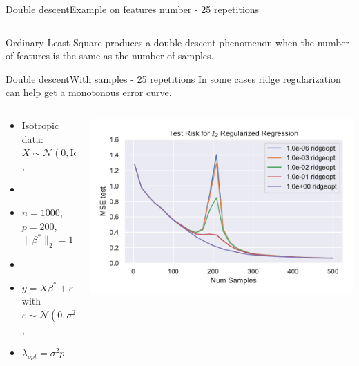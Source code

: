 \documentclass[10pt,aspectratio=43]{beamer}
\begin{document}
\begin{frame}{Double descent}{Example on features number - 25 repetitions}
\begin{columns}
\begin{column}{0.7\textwidth}
\begin{center}
             \end{center}
        \end{column}
        \end{columns}
        \begin{block}{}
            Ordinary Least Square produces a double descent phenomenon when the number of features is the same as the number of samples.
        \end{block}
\end{frame}


\begin{frame}{Double descent}{With samples \citep{nakkiran2020optimal} - 25 repetitions}
    In some cases ridge regularization can help get a monotonous error curve.
    \begin{columns}
        \begin{column}{0.46\textwidth}
            \begin{itemize}
                \item Isotropic data: $X\sim\mathcal{N}(0,\mathrm{Id})$,
                \item[]
                \item $n=1000$, $p=200$, $\|\beta^*\|_2=1$
                \item[]
                \item $y = X\beta^*+\varepsilon$ with $\varepsilon\sim \mathcal{N}(0, \sigma^2\mathrm{Id})$,
                \item $\lambda_{opt} = \sigma^2p$
            \end{itemize}
        \end{column}
        \begin{column}{0.7\textwidth}
            \begin{center}
             \includegraphics[width=1\textwidth]{double_descent.pdf}

\end{center}
\end{column}
\end{columns}
\end{frame}
\end{document}

